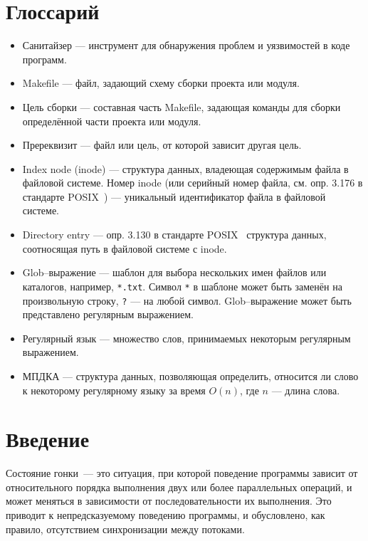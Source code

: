 \section{Глоссарий}
\label{sec:Glossary} 

\begin{itemize}
    \item Санитайзер --- инструмент для обнаружения проблем и уязвимостей в коде программ.
    \item Makefile --- файл, задающий схему сборки проекта или модуля.
    \item Цель сборки --- составная часть Makefile, задающая команды для сборки определённой части проекта или модуля.
    \item Пререквизит --- файл или цель, от которой зависит другая цель.
    \item Index node (inode) --- структура данных, владеющая содержимым файла в файловой системе. Номер inode (или серийный номер файла, см. опр. 3.176 в стандарте POSIX~\cite{8277153}) --- уникальный идентификатор файла в файловой системе.
    \item Directory entry --- опр. 3.130 в стандарте POSIX~\cite{8277153} структура данных, соотносящая путь в файловой системе с inode.
    \item Glob--выражение --- шаблон для выбора нескольких имен файлов или каталогов, например, \texttt{*.txt}. Символ \texttt{*} в шаблоне может быть заменён на произвольную строку, \texttt{?} --- на любой символ. Glob--выражение может быть представлено регулярным выражением.
    \item Регулярный язык --- множество слов, принимаемых некоторым регулярным выражением.
    \item МПДКА --- структура данных, позволяющая определить, относится ли слово к некоторому регулярному языку за время $O(n)$, где $n$ --- длина слова.
\end{itemize}

\section{Введение}
\label{sec:Chapter0} 


Состояние гонки~--- это ситуация, при которой поведение программы зависит от относительного порядка выполнения двух или более параллельных операций, и может меняться в зависимости от последовательности их выполнения. Это приводит к непредсказуемому поведению программы, и обусловлено, как правило, отсутствием синхронизации между потоками.

